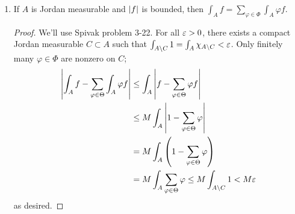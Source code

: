 \begin{enumerate}[label=(\roman*)]
    \newpage
    \item If $A$ is Jordan measurable and $\left\lvert f \right\rvert$ is bounded, then $\int_A f = \sum_{\varphi \in \Phi} \int_A \varphi f$.
    \begin{proof}
        We'll use Spivak problem 3-22. For all $\varepsilon > 0$, there exists a compact Jordan measurable $C \subset A$ such that $\int_{A \setminus C} 1 = \int_A \chi_{A \setminus C} < \varepsilon$. Only finitely many $\varphi \in \Phi$ are nonzero on $C$;
        \begin{align*}
            \left\lvert \int_A f - \sum_{\varphi \in \Theta} \int_A \varphi f \right\rvert &\leq \int_A \left\lvert f - \sum_{\varphi \in \Theta} \varphi f \right\rvert \\
            &\leq M \int_A \left\lvert 1 - \sum_{\varphi \in \Theta} \varphi \right\rvert \\
            &= M \int_A \left(1 - \sum_{\varphi \in \Theta} \varphi\right) \\
            &= M \int_A \sum_{\varphi \in \Theta} \varphi \leq M \int_{A \setminus C} 1 < M \varepsilon
        \end{align*}
        as desired.
    \end{proof}
\end{enumerate}
